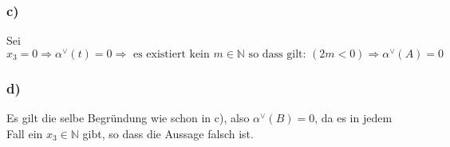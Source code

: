 \documentclass[11pt]{amsart}
\begin{document}
\subsubsection*{c)}
Sei \( x_3 = 0 \Rightarrow \alpha^{\vee}(t) = 0 \Rightarrow\mbox{ es existiert kein } m \in \mathbb{N} 
\mbox{ so dass gilt: } (2m < 0) \Rightarrow \alpha^{\vee}(A) = 0  \)

\subsubsection*{d)}
Es gilt die selbe Begründung wie schon in c), also $\alpha^{\vee}(B) = 0$, da es in jedem Fall
ein $x_3 \in \mathbb{N}$ gibt, so dass die Aussage falsch ist.
\end{document}

